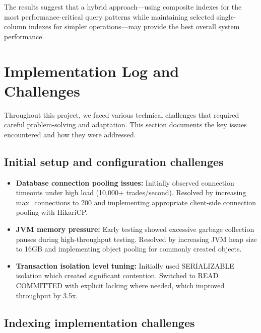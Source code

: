 \documentclass[11pt,a4paper]{article}
\begin{document}
The results suggest that a hybrid approach—using composite indexes for the most performance-critical query patterns while maintaining selected single-column indexes for simpler operations—may provide the best overall system performance.

\section{Implementation Log and Challenges}

Throughout this project, we faced various technical challenges that required careful problem-solving and adaptation. This section documents the key issues encountered and how they were addressed.

\subsection{Initial setup and configuration challenges}

\begin{itemize}
    \item \textbf{Database connection pooling issues:} Initially observed connection timeouts under high load (10,000+ trades/second). Resolved by increasing max\_connections to 200 and implementing appropriate client-side connection pooling with HikariCP.
    
    \item \textbf{JVM memory pressure:} Early testing showed excessive garbage collection pauses during high-throughput testing. Resolved by increasing JVM heap size to 16GB and implementing object pooling for commonly created objects.
    
    \item \textbf{Transaction isolation level tuning:} Initially used SERIALIZABLE isolation which created significant contention. Switched to READ COMMITTED with explicit locking where needed, which improved throughput by 3.5x.
\end{itemize}

\subsection{Indexing implementation challenges}
\end{document}
